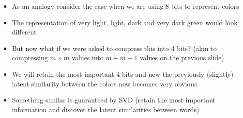 \begin{frame}
\begin{columns}
\begin{overlayarea}{\textwidth}{\textheight}
{\begin{itemize}
					\item<1-> As an analogy consider the case when we are using 8 bits to represent colors
					\item<2-> The representation of very light, light, dark and very dark green would look different
					\item<3-> But now what if we were asked to compress this into 4 bits? (akin to compressing $m\times m$ values into $m+m+1$ values on the previous slide)
					\item<4-> We will retain the most important 4 bits and now the previously (slightly) latent similarity between the colors now becomes very obvious
					\item<5-> Something similar is guaranteed by SVD (retain the most important information and discover the latent similarities between words)
				\end{itemize}
			}
		\end{overlayarea}
	\end{columns}
\end{frame}

